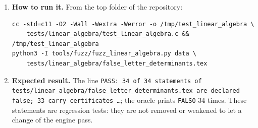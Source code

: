 \documentclass[11pt,a4paper]{article}
\begin{document}
\begin{enumerate}
\item \textbf{How to run it.} From the top folder of the repository:
\begin{verbatim}
cc -std=c11 -O2 -Wall -Wextra -Werror -o /tmp/test_linear_algebra \
    tests/linear_algebra/test_linear_algebra.c && /tmp/test_linear_algebra
python3 -I tools/fuzz/fuzz_linear_algebra.py data \
    tests/linear_algebra/false_letter_determinants.tex
\end{verbatim}

\item \textbf{Expected result.} The line \texttt{PASS: 34 of 34 statements of tests/linear\_algebra/false\_letter\_determinants.tex are declared false; 33 carry certificates \dots}; the oracle prints \texttt{FALSO} 34 times. These statements are regression tests: they are not removed or weakened to let a change of the engine pass.
\end{enumerate}
\end{document}
